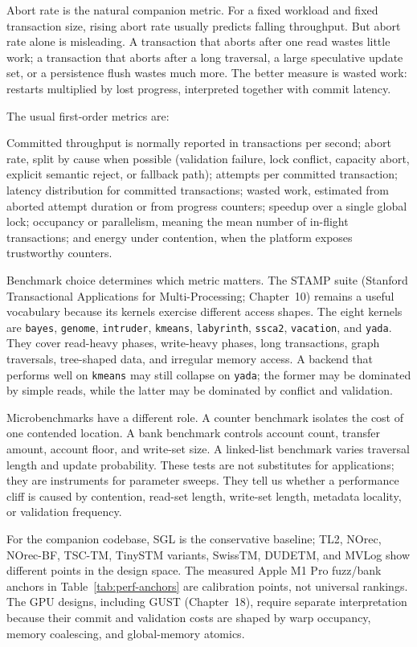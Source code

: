 Abort rate is the natural companion metric. For a fixed workload and fixed transaction size, rising abort rate usually predicts falling throughput. But abort rate alone is misleading. A transaction that aborts after one read wastes little work; a transaction that aborts after a long traversal, a large speculative update set, or a persistence flush wastes much more. The better measure is wasted work: restarts multiplied by lost progress, interpreted together with commit latency.

The usual first-order metrics are:

Committed throughput is normally reported in transactions per second; abort rate, split by cause when possible (validation failure, lock conflict, capacity abort, explicit semantic reject, or fallback path); attempts per committed transaction; latency distribution for committed transactions; wasted work, estimated from aborted attempt duration or from progress counters; speedup over a single global lock; occupancy or parallelism, meaning the mean number of in-flight transactions; and energy under contention, when the platform exposes trustworthy counters.

Benchmark choice determines which metric matters. The STAMP suite (Stanford Transactional Applications for Multi-Processing; Chapter~10) remains a useful vocabulary because its kernels exercise different access shapes. The eight kernels are \texttt{bayes}, \texttt{genome}, \texttt{intruder}, \texttt{kmeans}, \texttt{labyrinth}, \texttt{ssca2}, \texttt{vacation}, and \texttt{yada}. They cover read-heavy phases, write-heavy phases, long transactions, graph traversals, tree-shaped data, and irregular memory access. A backend that performs well on \texttt{kmeans} may still collapse on \texttt{yada}; the former may be dominated by simple reads, while the latter may be dominated by conflict and validation.

Microbenchmarks have a different role. A counter benchmark isolates the cost of one contended location. A bank benchmark controls account count, transfer amount, account floor, and write-set size. A linked-list benchmark varies traversal length and update probability. These tests are not substitutes for applications; they are instruments for parameter sweeps. They tell us whether a performance cliff is caused by contention, read-set length, write-set length, metadata locality, or validation frequency.

For the companion codebase, SGL is the conservative baseline; TL2, NOrec, NOrec-BF, TSC-TM, TinySTM variants, SwissTM, DUDETM, and MVLog show different points in the design space. The measured Apple M1 Pro fuzz/bank anchors in Table~\ref{tab:perf-anchors} are calibration points, not universal rankings. The GPU designs, including GUST (Chapter~18), require separate interpretation because their commit and validation costs are shaped by warp occupancy, memory coalescing, and global-memory atomics.

